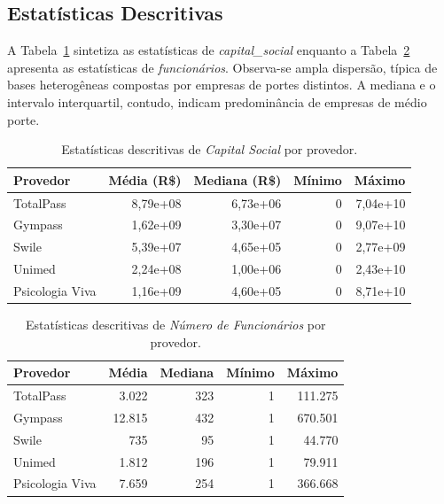 \subsection{Estatísticas Descritivas}

A Tabela~\ref{tab:7_3a_capital} sintetiza as estatísticas de \textit{capital\_social} enquanto a Tabela~\ref{tab:7_3b_funcionarios} apresenta as estatísticas de \textit{funcionários}. Observa-se ampla dispersão, típica de bases heterogêneas compostas por empresas de portes distintos. A mediana e o intervalo interquartil, contudo, indicam predominância de empresas de médio porte.

\begin{table}[H]
\centering
\caption{Estatísticas descritivas de \textit{Capital Social} por provedor.}
\label{tab:7_3a_capital}
\begin{tabular}{lrrrr}
\toprule
\textbf{Provedor} & \textbf{Média (R\$)} & \textbf{Mediana (R\$)} & \textbf{Mínimo} & \textbf{Máximo} \\
\midrule
TotalPass & 8,79e+08 & 6,73e+06 & 0 & 7,04e+10 \\
Gympass & 1,62e+09 & 3,30e+07 & 0 & 9,07e+10 \\
Swile & 5,39e+07 & 4,65e+05 & 0 & 2,77e+09 \\
Unimed & 2,24e+08 & 1,00e+06 & 0 & 2,43e+10 \\
Psicologia Viva & 1,16e+09 & 4,60e+05 & 0 & 8,71e+10 \\
\bottomrule
\end{tabular}
\end{table}

\begin{table}[H]
\centering
\caption{Estatísticas descritivas de \textit{Número de Funcionários} por provedor.}
\label{tab:7_3b_funcionarios}
\begin{tabular}{lrrrr}
\toprule
\textbf{Provedor} & \textbf{Média} & \textbf{Mediana} & \textbf{Mínimo} & \textbf{Máximo} \\
\midrule
TotalPass & 3.022 & 323 & 1 & 111.275 \\
Gympass & 12.815 & 432 & 1 & 670.501 \\
Swile & 735 & 95 & 1 & 44.770 \\
Unimed & 1.812 & 196 & 1 & 79.911 \\
Psicologia Viva & 7.659 & 254 & 1 & 366.668 \\
\bottomrule
\end{tabular}
\end{table}

